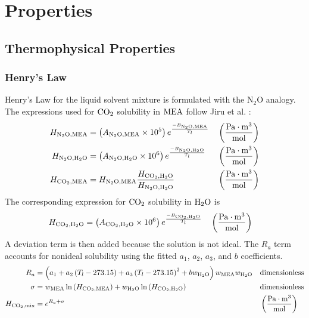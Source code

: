     \vspace{1cm}
    \section{Properties}\label{sec:properties}
        \vspace{1cm}
        \subsection{Thermophysical Properties}
            \vspace{1cm}
            \subsubsection{Henry's Law}
                Henry's Law for the liquid solvent mixture is formulated with the N$_2$O analogy. The expressions used for $\COtwo$ solubility in $\MEA$ follow Jiru et al. \cite{Jiru2012}:
                \begin{align}
                    H_{\NtwoO,\MEA} &= \left(A_{\NtwoO,\MEA} \times 10^5\right) e^{\frac{-B_{\NtwoO,\MEA}}{T_l}} && \left(\frac{\unit{Pa} \cdot \unit{m}^3}{\unit{mol}} \right)\\
                    H_{\NtwoO,\HtwoO} &= \left(A_{\NtwoO,\HtwoO} \times 10^6\right) e^{\frac{-B_{\NtwoO,\HtwoO}}{T_l}} && \left(\frac{\unit{Pa} \cdot \unit{m}^3}{\unit{mol}} \right)\\
                    H_{\COtwo,\MEA} &= H_{\NtwoO,\MEA} \frac{H_{\COtwo, \HtwoO}}{H_{\NtwoO,\HtwoO}} && \left(\frac{\unit{Pa} \cdot \unit{m}^3}{\unit{mol}} \right)
                \end{align}
                The corresponding expression for $\COtwo$ solubility in $\HtwoO$ is
                \begin{align}
                    H_{\COtwo, \HtwoO} &= \left(A_{\COtwo, \HtwoO} \times 10^6\right) e^{\frac{-B_{\COtwo, \HtwoO}}{T_l}} && \left(\frac{\unit{Pa} \cdot \unit{m}^3}{\unit{mol}} \right)
                \end{align}
                A deviation term is then added because the solution is not ideal. The $R_a$ term accounts for nonideal solubility using the fitted $a_1$, $a_2$, $a_3$, and $b$ coefficients.
                \begin{align}
                    R_{a} &= \left(a_1+a_2 \left(T_l-273.15\right)+a_3 \left(T_l-273.15\right)^2+b w_{\HtwoO}\right) w_{\MEA} w_{\HtwoO}
                    && \text{dimensionless}\\
                    \sigma &= w_{\MEA} \ln\left(H_{\COtwo,\MEA}\right)+w_{\HtwoO} \ln\left(H_{\COtwo,\HtwoO}\right)
                    && \text{dimensionless}\\
                    H_{\COtwo,\text{mix}} &= e^{R_{a} + \sigma} && \left(\frac{\unit{Pa} \cdot \unit{m}^3}{\unit{mol}} \right)
                \end{align}


